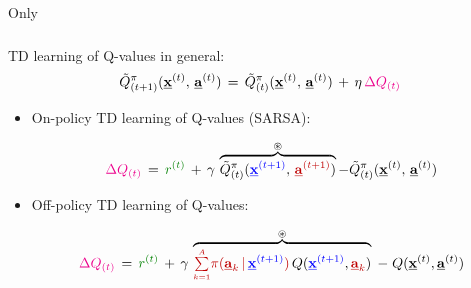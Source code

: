 \begin{frame}{Only} \frametitle{\subsecname}
	
	TD learning of Q-values in general:
	\begin{equation}
			\tilde{Q}^\pi_{(t+1)}(\underline{\mathbf{x}}^{(t)},\, \underline{\mathbf{a}}^{(t)} )
			\,= \,
			\tilde{Q}^\pi_{(t)}( \underline{\mathbf{x}}^{(t)},\, \underline{\mathbf{a}}^{(t)} ) \, + \, \eta \, {\color{magenta}\Delta Q_{(t)}}
	\end{equation}
	
	
	
	\begin{itemize}
		\item<only@2> On-policy TD learning of Q-values (SARSA):
		
		\begin{equation}
				{\color{magenta}\Delta Q_{(t)}} \,=\, {\color{reward} r^{(t)}} \, + \, \gamma \, \overbrace{\tilde{Q}^\pi_{(t)} ({\color{trans}  \vec x^{(t+1)}},\,{\color{policy}  \vec a^{(t+1)}} )}^{\circledast} - \tilde{Q}^\pi_{(t)} ( \vec x^{(t)},\, \vec a^{(t)} )
				\label{eq:deltaqONpolicy}
		\end{equation}
		
		\item<only@2,3> Off-policy TD learning of Q-values:
		
		\slidesonly{\vspace{-5mm}}
		
		\begin{equation}
					{\color{magenta}\Delta Q_{(t)}} \,=\, {\color{reward}r^{(t)}} 
				 \, + \, \gamma \, \overbrace{{\color{policy}\smallsum{k=1}{A}
					\pi(\vec a_k \,|\, {\color{trans}\vec x^{(t+1)}})} \,
					Q({\color{trans}\vec x^{(t+1)}}, {\color{policy}\vec a_k})}^{\circledast} 
				\;-\; Q(\vec x^{(t)}, \vec a^{(t)})
				\label{eq:deltaqOFFpolicy}
		\end{equation}
		

\end{itemize}
\end{frame}
